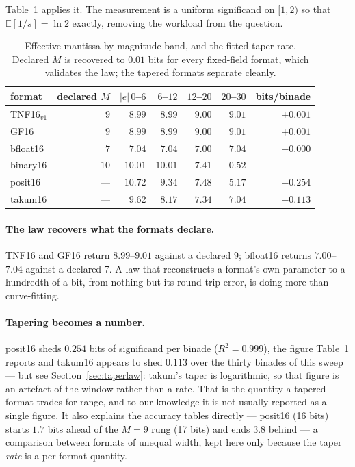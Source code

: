 Table~\ref{tab:meff} applies it. The measurement is a uniform significand on
$[1,2)$ so that $\mathbb{E}[1/s] = \ln 2$ exactly, removing the workload from the
question.

\begin{table}[t]\centering
\caption{Effective mantissa by magnitude band, and the fitted taper rate. Declared
$M$ is recovered to $0.01$ bits for every fixed-field format, which validates the
law; the tapered formats separate cleanly.}
\label{tab:meff}
\begin{tabular}{lrrrrrr}
\toprule
format & declared $M$ & $|e|\,0$--$6$ & $6$--$12$ & $12$--$20$ & $20$--$30$ & bits/binade \\
\midrule
TNF16$_{v1}$ & $9$  & $8.99$  & $8.99$ & $9.00$ & $9.01$ & $+0.001$ \\
GF16     & $9$  & $8.99$  & $8.99$ & $9.00$ & $9.01$ & $+0.001$ \\
bfloat16 & $7$  & $7.04$  & $7.04$ & $7.00$ & $7.04$ & $-0.000$ \\
binary16 & $10$ & $10.01$ & $10.01$ & $7.41$ & $0.52$ & --- \\
posit16  & ---  & $10.72$ & $9.34$ & $7.48$ & $5.17$ & $\mathbf{-0.254}$ \\
takum16  & ---  & $9.62$  & $8.17$ & $7.34$ & $7.04$ & $\mathbf{-0.113}$ \\
\bottomrule
\end{tabular}
\end{table}

\paragraph{The law recovers what the formats declare.} TNF16 and GF16 return
$8.99$--$9.01$ against a declared 9; bfloat16 returns $7.00$--$7.04$ against a
declared 7. A law that reconstructs a format's own parameter to a hundredth of a
bit, from nothing but its round-trip error, is doing more than curve-fitting.

\paragraph{Tapering becomes a number.} posit16 sheds $0.254$ bits of significand
per binade ($R^2 = 0.999$), the figure Table~\ref{tab:meff} reports and takum16 appears to shed $0.113$ over the thirty
binades of this sweep --- but see Section~\ref{sec:taperlaw}: takum's taper is
logarithmic, so that figure is an artefact of the window rather than a rate. That is the
quantity a tapered format trades for range, and to our knowledge it is not usually
reported as a single figure. It also explains the accuracy tables directly ---
posit16 (16 bits) starts $1.7$ bits ahead of the $M{=}9$ rung (17 bits) and
ends $3.8$ behind --- a comparison between formats of unequal width, kept here
only because the taper \emph{rate} is a per-format quantity.

